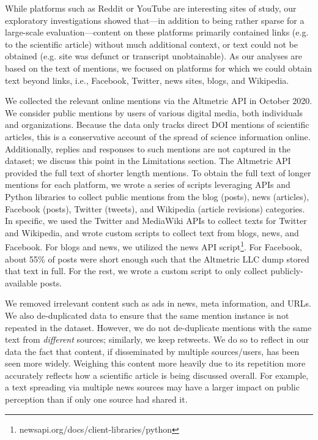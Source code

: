 \documentclass[letterpaper]{article} %
\begin{document}
While platforms such as Reddit or YouTube are interesting sites of study, our exploratory investigations showed that---in addition to being rather sparse for a large-scale evaluation---content on these platforms primarily contained links (e.g. to the scientific article) without much additional context, or text could not be obtained (e.g. site was defunct or transcript unobtainable). As our analyses are based on the text of mentions, we focused on platforms for which we could obtain text beyond links, i.e., Facebook, Twitter, news sites, blogs, and Wikipedia.

We collected the relevant online mentions via the Altmetric API in October 2020. We consider public mentions by users of various digital media, both individuals and organizations. Because the data only tracks direct DOI mentions of scientific articles, this is a conservative account of the spread of science information online. Additionally, replies and responses to such mentions are not captured in the dataset; we discuss this point in the Limitations section.
The Altmetric API provided the full text of shorter length mentions. To obtain the full text of longer mentions for each platform, we wrote a series of scripts leveraging APIs and Python libraries to collect public mentions from the blog (posts), news (articles), Facebook (posts), Twitter (tweets), and Wikipedia (article revisions) categories. %
In specific, we used the Twitter and MediaWiki APIs to collect texts for Twitter and Wikipedia, and wrote custom scripts to collect text from blogs, news, and Facebook. For blogs and news, we utilized the news API script\footnote{newsapi.org/docs/client-libraries/python}. For Facebook, about 55\% of posts were short enough such that the Altmetric LLC dump stored that text in full. For the rest, we wrote a custom script to only collect publicly-available posts.

We removed irrelevant content such as ads in news, meta information, and URLs. We also de-duplicated data to ensure that the same mention instance is not repeated in the dataset. However, we do not de-duplicate mentions with the same text from \textit{different} sources; similarly, we keep retweets. We do so to reflect in our data the fact that content, if disseminated by multiple sources/users, has been seen more widely. Weighing this content more heavily due to its repetition more accurately reflects how a scientific article is being discussed overall. For example, a text spreading via multiple news sources may have a larger impact on public perception than if only one source had shared it.
\end{document}
